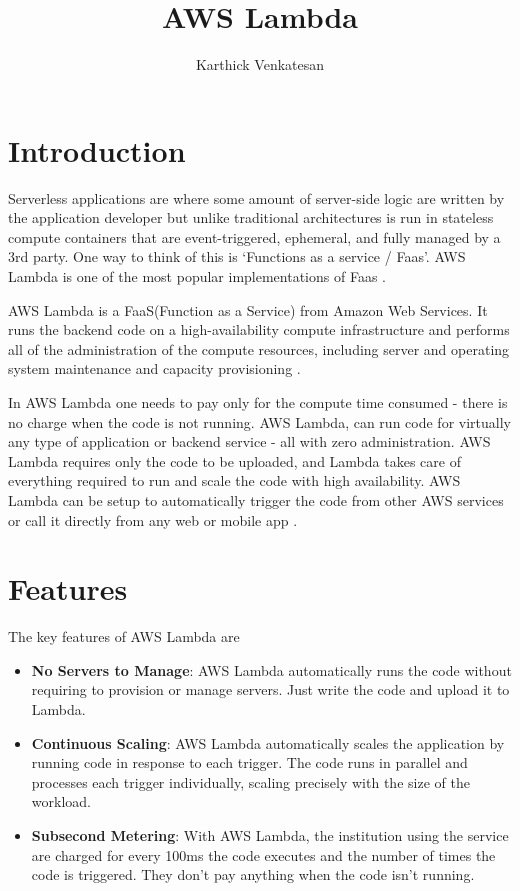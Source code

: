 \documentclass[9pt,twocolumn,twoside]{../../styles/osajnl}
\title{AWS Lambda}
\author[1,*,+]{Karthick Venkatesan}
\affil[1]{School of Informatics and Computing, Bloomington, IN 47408, U.S.A.}
\affil[*]{Corresponding authors: vkarthickprabu@gmail.com}
\affil[+]{HID - S17-IO-3023}
\begin{document}
\maketitle

\section{Introduction}

Serverless applications are where some amount of server-side logic are written 
by the application developer but unlike traditional architectures is run in 
stateless compute containers that are event-triggered, ephemeral, and fully 
managed by a 3rd party. One way to think of this is ‘Functions as a service / 
Faas'. AWS Lambda is one of the most popular implementations of Faas 
\cite{www-Serverless}.


AWS Lambda is a FaaS(Function as a Service)  from Amazon Web Services. It runs 
the backend code on a high-availability compute infrastructure and performs all 
of the administration of the compute resources, including server and operating 
system maintenance and capacity provisioning \cite{www-CouchAWSLambda}.
 
In AWS Lambda one needs to pay only for the compute time consumed - there is no 
charge when the code is not running. AWS Lambda, can run code for virtually any 
type of application or backend service - all with zero administration. AWS 
Lambda requires only the code to be uploaded, and Lambda takes care of 
everything required to run and scale the code with high availability. AWS 
Lambda can be setup to automatically trigger the code from other AWS services 
or call it directly from any web or mobile app \cite{www-AWSLambda}.



\section{Features}

The key features of AWS Lambda are \cite{www-AWSLambda}
\begin{itemize}
\renewcommand{\labelitemi}{\scriptsize$\bullet$} 
\item \textbf{No Servers to Manage}: AWS Lambda automatically runs the code 
without requiring to provision or manage servers. Just write the code and 
upload it to Lambda.

\item \textbf{Continuous Scaling}: AWS Lambda automatically scales the 
application by running code in response to each trigger. The code runs in 
parallel and processes each trigger individually, scaling precisely with the 
size of the workload.

\item \textbf{Subsecond Metering}: With AWS Lambda, the institution using the 
service are charged for every 100ms the code executes and the number of times 
the code is triggered. They don't pay anything when the code isn't running.

\end{itemize}
\end{document}
